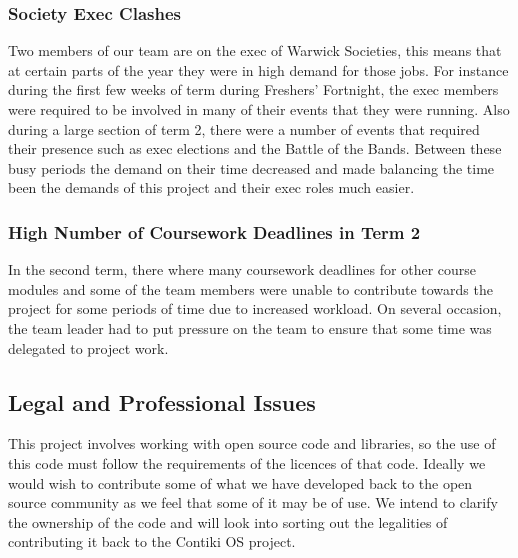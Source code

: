 \subsubsection{Society Exec Clashes}
Two members of our team are on the exec of Warwick Societies, this means that at certain parts of the year they were in high demand for those jobs. For instance during the first few weeks of term during Freshers' Fortnight, the exec members were required to be involved in many of their events that they were running. Also during a large section of term 2, there were a number of events that required their presence such as exec elections and the Battle of the Bands. Between these busy periods the demand on their time decreased and made balancing the time been the demands of this project and their exec roles much easier.

\subsubsection{High Number of Coursework Deadlines in Term 2}
In the second term, there where many coursework deadlines for other course modules and some of the team members were unable to contribute towards the project for some periods of time due to increased workload. On several occasion, the team leader had to put pressure on the team to ensure that some time was delegated to project work. 

\subsection{Legal and Professional Issues}

This project involves working with open source code and libraries, so the use of this code must follow the requirements of the licences of that code. Ideally we would wish to contribute some of what we have developed back to the open source community as we feel that some of it may be of use. We intend to clarify the ownership of the code and will look into sorting out the legalities of contributing it back to the Contiki OS project.


